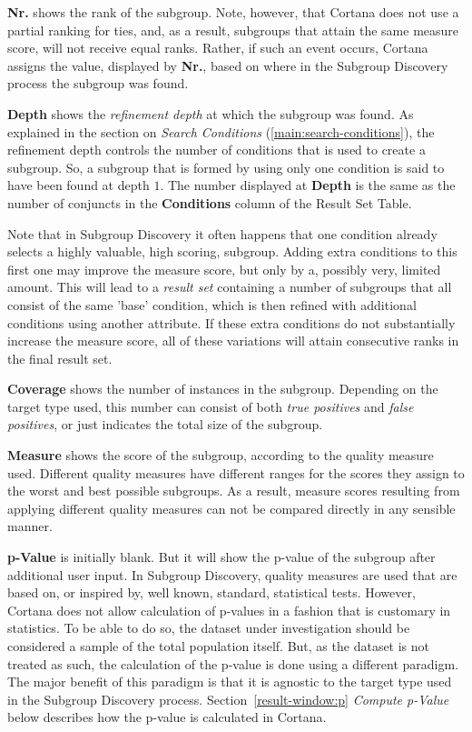 \documentclass{article}
\begin{document}
\textbf{Nr.} shows the rank of the subgroup.
Note, however, that Cortana does not use a partial ranking for ties, and, as a result, subgroups that attain the same measure score, will not receive equal ranks.
Rather, if such an event occurs, Cortana assigns the value, displayed by \textbf{Nr.}, based on where in the Subgroup Discovery process the subgroup was found.

\textbf{Depth} shows the \emph{refinement depth} at which the subgroup was found.
As explained in the section on \emph{Search Conditions} (\ref{main:search-conditions}), the refinement depth controls the number of conditions that is used to create a subgroup.
So, a subgroup that is formed by using only one condition is said to have been found at depth $1$.
The number displayed at \textbf{Depth} is the same as the number of conjuncts in the \textbf{Conditions} column of the Result Set Table.

Note that in Subgroup Discovery it often happens that one condition already selects a highly valuable, high scoring, subgroup.
Adding extra conditions to this first one may improve the measure score, but only by a, possibly very, limited amount.
This will lead to a \emph{result set} containing a number of subgroups that all consist of the same 'base' condition, which is then refined with additional conditions using another attribute.
If these extra conditions do not substantially increase the measure score, all of these variations will attain consecutive ranks in the final result set.

\textbf{Coverage} shows the number of instances in the subgroup.
Depending on the target type used, this number can consist of both \emph{true positives} and \emph{false positives}, or just indicates the total size of the subgroup.

\textbf{Measure} shows the score of the subgroup, according to the quality measure used.
Different quality measures have different ranges for the scores they assign to the worst and best possible subgroups.
As a result, measure scores resulting from applying different quality measures can not be compared directly in any sensible manner.

\textbf{p-Value} is initially blank.
But it will show the p-value of the subgroup after additional user input.
In Subgroup Discovery, quality measures are used that are based on, or inspired by, well known, standard, statistical tests.
However, Cortana does not allow calculation of p-values in a fashion that is customary in statistics.
To be able to do so, the dataset under investigation should be considered a sample of the total population itself.
But, as the dataset is not treated as such, the calculation of the p-value is done using a different paradigm.
The major benefit of this paradigm is that it is agnostic to the target type used in the Subgroup Discovery process.
Section~\ref{result-window:p} \emph{Compute p-Value} below describes how the p-value is calculated in Cortana.
\end{document}
